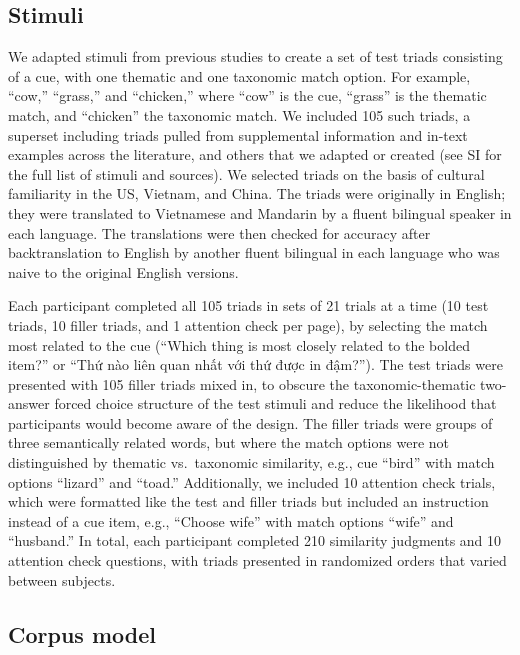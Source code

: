 \documentclass[10pt, letterpaper]{article}
\begin{document}
\hypertarget{stimuli}{%
\subsection{Stimuli}\label{stimuli}}

We adapted stimuli from previous studies to create a set of test triads
consisting of a cue, with one thematic and one taxonomic match option.
For example, ``cow,'' ``grass,'' and ``chicken,'' where ``cow'' is the
cue, ``grass'' is the thematic match, and ``chicken'' the taxonomic
match. We included 105 such triads, a superset including triads pulled
from supplemental information and in-text examples across the
literature, and others that we adapted or created (see SI for the full
list of stimuli and sources). We selected triads on the basis of
cultural familiarity in the US, Vietnam, and China. The triads were
originally in English; they were translated to Vietnamese and Mandarin
by a fluent bilingual speaker in each language. The translations were
then checked for accuracy after backtranslation to English by another
fluent bilingual in each language who was naive to the original English
versions.

Each participant completed all 105 triads in sets of 21 trials at a time
(10 test triads, 10 filler triads, and 1 attention check per page), by
selecting the match most related to the cue (``Which thing is most
closely related to the bolded item?'' or ``Thứ nào liên quan nhất với
thứ được in đậm?''). The test triads were presented with 105 filler
triads mixed in, to obscure the taxonomic-thematic two-answer forced
choice structure of the test stimuli and reduce the likelihood that
participants would become aware of the design. The filler triads were
groups of three semantically related words, but where the match options
were not distinguished by thematic vs.~taxonomic similarity, e.g., cue
``bird'' with match options ``lizard'' and ``toad.'' Additionally, we
included 10 attention check trials, which were formatted like the test
and filler triads but included an instruction instead of a cue item,
e.g., ``Choose wife'' with match options ``wife'' and ``husband.'' In
total, each participant completed 210 similarity judgments and 10
attention check questions, with triads presented in randomized orders
that varied between subjects.

\hypertarget{corpus-model}{%
\subsection{Corpus model}\label{corpus-model}}
\end{document}
